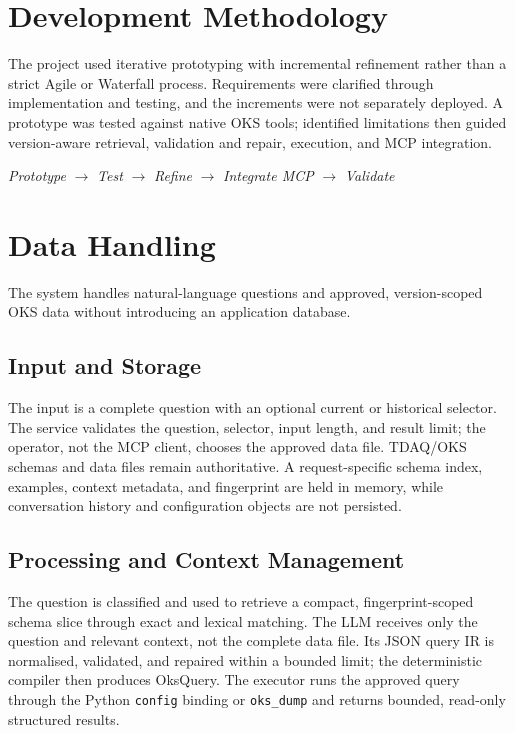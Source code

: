 \documentclass[12pt, a4paper]{report}
\begin{document}
\section{Development Methodology}
The project used iterative prototyping with incremental refinement rather than
a strict Agile or Waterfall process. Requirements were clarified through
implementation and testing, and the increments were not separately deployed.
A prototype was tested against native OKS tools; identified limitations then
guided version-aware retrieval, validation and repair, execution, and MCP
integration.

\begin{center}
\textit{Prototype} $\rightarrow$ \textit{Test} $\rightarrow$ \textit{Refine}
$\rightarrow$ \textit{Integrate MCP} $\rightarrow$ \textit{Validate}
\end{center}

\section{Data Handling}
The system handles natural-language questions and approved, version-scoped OKS
data without introducing an application database.

\subsection{Input and Storage}

The input is a complete question with an optional current or historical
selector. The service validates the question, selector, input length, and
result limit; the operator, not the MCP client, chooses the approved data file.
TDAQ/OKS schemas and data files remain authoritative. A request-specific schema
index, examples, context metadata, and fingerprint are held in memory, while
conversation history and configuration objects are not persisted.

\subsection{Processing and Context Management}

The question is classified and used to retrieve a compact, fingerprint-scoped
schema slice through exact and lexical matching. The LLM receives only the
question and relevant context, not the complete data file. Its JSON query IR is
normalised, validated, and repaired within a bounded limit; the deterministic
compiler then produces OksQuery. The executor runs the approved query through
the Python \texttt{config} binding or \texttt{oks\_dump} and returns bounded,
read-only structured results.
\end{document}
